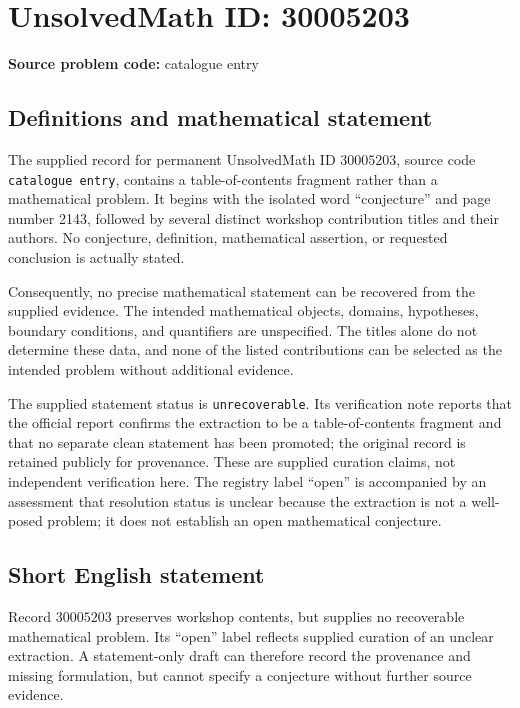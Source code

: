 \documentclass[11pt]{article}
\begin{document}
\section*{UnsolvedMath ID: 30005203}
\textbf{Source problem code:} catalogue entry
\subsection{Definitions and mathematical statement}
The supplied record for permanent UnsolvedMath ID \(30005203\), source code \texttt{catalogue entry}, contains a table-of-contents fragment rather than a mathematical problem. It begins with the isolated word ``conjecture'' and page number 2143, followed by several distinct workshop contribution titles and their authors. No conjecture, definition, mathematical assertion, or requested conclusion is actually stated.

Consequently, no precise mathematical statement can be recovered from the supplied evidence. The intended mathematical objects, domains, hypotheses, boundary conditions, and quantifiers are unspecified. The titles alone do not determine these data, and none of the listed contributions can be selected as the intended problem without additional evidence.

The supplied statement status is \texttt{unrecoverable}. Its verification note reports that the official report confirms the extraction to be a table-of-contents fragment and that no separate clean statement has been promoted; the original record is retained publicly for provenance. These are supplied curation claims, not independent verification here. The registry label ``open'' is accompanied by an assessment that resolution status is unclear because the extraction is not a well-posed problem; it does not establish an open mathematical conjecture.
\subsection{Short English statement}
Record \(30005203\) preserves workshop contents, but supplies no recoverable mathematical problem. Its ``open'' label reflects supplied curation of an unclear extraction. A statement-only draft can therefore record the provenance and missing formulation, but cannot specify a conjecture without further source evidence.
\end{document}

